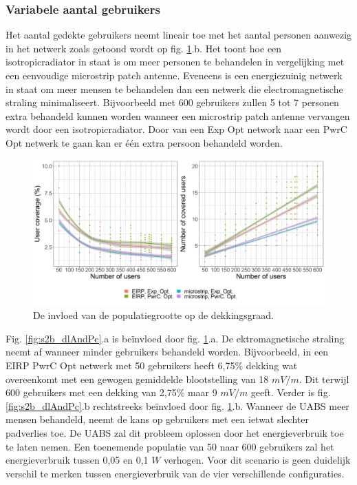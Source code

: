 \documentclass[twocolumn]{phdsymp_dutch}
\begin{document}
\subsubsection{Variabele aantal gebruikers}
Het aantal gedekte gebruikers neemt lineair toe met het aantal personen aanwezig in het netwerk zoals getoond wordt op fig.
\ref{fig:s2uvsnumcovusers}.b. Het toont hoe een \gls{isotropicradiator} in staat is om meer personen te behandelen in vergelijking met een eenvoudige
 microstrip patch antenne. Eveneens is een energiezuinig netwerk in staat om meer mensen te behandelen dan een netwerk die electromagnetische straling minimaliseert.
 Bijvoorbeeld met 600 gebruikers zullen 5 tot 7 personen extra behandeld kunnen worden wanneer 
 een microstrip patch antenne vervangen wordt door een  \gls{isotropicradiator}.
Door van een \gls{Exp Opt} network naar een \gls{PwrC Opt} netwerk te gaan kan er \'e\'en extra persoon 
behandeld worden.

\begin{figure}[h!]
  \includegraphics[width=\linewidth]{s2/uvsnumdronesAndCov.png}
  \caption{De invloed van de populatiegrootte op de dekkingsgraad.}
  \label{fig:s2uvsnumcovusers}
\end{figure}

Fig. \ref{fig:s2b_dlAndPc}.a  is be\"invloed door fig. \ref{fig:s2uvsnumcovusers}.a. 
De ektromagnetische straling neemt af wanneer minder gebruikers behandeld worden.
Bijvoorbeeld, in een EIRP \gls{PwrC Opt} netwerk met 50 gebruikers heeft 6,75\%
dekking wat overeenkomt met een gewogen gemiddelde blootstelling van 18 $mV/m$. Dit terwijl
 600 gebruikers met een dekking van 2,75\% maar 9 $mV/m$ geeft.
Verder is fig. \ref{fig:s2b_dlAndPc}.b rechtstreeks be\"invloed door fig.  \ref{fig:s2uvsnumcovusers}.b.
Wanneer de \gls{UABS} meer mensen behandeld, neemt de kans op gebruikers met een ietwat slechter padverlies toe.
De  \gls{UABS} zal dit probleem oplossen door het energieverbruik toe te laten nemen.
Een toenemende populatie van 50 naar 600 gebruikers zal het energieverbruik tussen 0,05 en 0,1 $W$ verhogen.
Voor dit scenario is geen duidelijk verschil te merken tussen energieverbruik van de vier verschillende configuraties.
\end{document}
